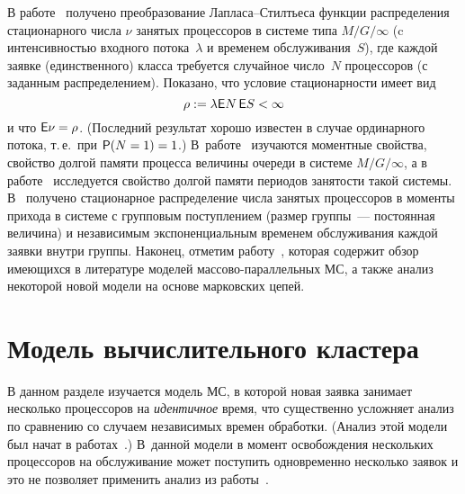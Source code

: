 \begin{multicols}{2}
 В работе~\cite{tihonenko}  получено  преобразование Лап\-ла\-са--Стил\-ть\-еса
функции распределения стационарного числа $\nu$ занятых процессоров
в системе типа $M/G/\infty$ (c интенсивностью входного потока~$\lambda$  
и временем обслуживания~$S$), где каждой заявке
(единственного) класса требуется случайное  чис\-ло~$N$ процессоров (с
заданным распределением). Показано,  что  условие стационарности
имеет вид
\begin{equation}
\label{tihon1}
    \rho:=\lambda {\sf E} N\, {\sf E} S<\infty
\end{equation}
и что  ${\sf E}\nu =\rho$. (Последний  результат хорошо известен в случае
ординарного потока, т.\,е.\ при $\p(N=1)\hm=1$.) В~работе~\cite{eliazar}
изучаются моментные свойства,  свойство долгой
памяти  процесса величины очереди в системе $M/G/\infty$, а в
работе~\cite{daley-busy} исследуется  свойство долгой памяти
периодов занятости такой системы. В~\cite{brandt} получено
стационарное распределение  числа занятых процессоров в моменты
прихода в системе с групповым поступлением (размер группы~---
постоянная величина) и  независимым экспоненциальным временем
обслуживания каждой заявки внутри группы. Наконец, отметим
работу~\cite{krampe10}, которая содержит обзор име\-ющих\-ся в
литературе моделей мас\-со\-во-па\-рал\-лель\-ных МС, а также анализ некоторой новой
модели на основе марковских цепей.

\section{Модель вычислительного кластера}\label{sec3}

В данном разделе изучается модель МС, в которой новая заявка
занимает несколько процессоров на {\it идентичное} время, что
существенно усложняет  анализ по сравнению со случаем независимых
времен обработки. (Анализ этой модели был начат  в
работах~\cite{pavt11, rudn11}.)  В~данной модели в момент
освобождения нескольких процессоров на обслуживание может поступить
одновременно несколько заявок и это не позволяет  применить анализ
из работы~\cite{green80}.


\end{multicols}
